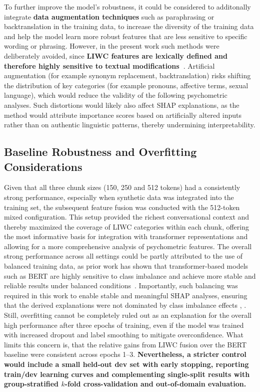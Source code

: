To further improve the model's robustness, it could be considered to additonally integrate \textbf{data augmentation techniques} such as paraphrasing or backtranslation in the training data, to increase the diversity of the training data and help the model learn more robust features that are less sensitive to specific wording or phrasing. However, in the present work such methods were deliberately avoided, since \textbf{LIWC features are lexically defined and therefore highly sensitive to textual modifications~\cite{tausczik2010psychological}}. Artificial augmentation (for example synonym replacement, backtranslation) risks shifting the distribution of key categories (for example pronouns, affective terms, sexual language), which would reduce the validity of the following psychometric analyses. Such distortions would likely also affect SHAP explanations, as the method would attribute importance scores based on artificially altered inputs rather than on authentic linguistic patterns, thereby undermining interpretability. 

\subsection{Baseline Robustness and Overfitting Considerations}
Given that all three chunk sizes (150, 250 and 512 tokens) had a consistently strong performance, especially when synthetic data was integrated into the training set, the subsequent feature fusion was conducted with the 512-token mixed configuration. This setup provided the richest conversational context and thereby maximized the coverage of LIWC categories within each chunk, offering the most informative basis for integration with transformer representations and allowing for a more comprehensive analysis of psychometric features. The overall strong performance across all settings could be partly attributed to the use of balanced training data, as prior work has shown that transformer-based models such as BERT are highly sensitive to class imbalance and achieve more stable and reliable results under balanced conditions~\cite{henningnlpclassimbalance2023}. Importantly, such balancing was required in this work to enable stable and meaningful SHAP analyses, ensuring that the derived explanations were not dominated by class imbalance effects \parencite{liu2022balancedbackgroundexplanationdata}, \parencite{chen2024interpretable}. Still, overfitting cannot be completely ruled out as an explanation for the overall high performance after three epochs of training, even if the model was trained with increased dropout and label smoothing to mitigate overconfidence. What limits this concern is, that the relative gains from LIWC fusion over the BERT baseline were consistent across epochs 1–3. \textbf{Nevertheless, a stricter control would include a small held-out dev set with early stopping, reporting train/dev learning curves and complementing single-split results with group-stratified $k$-fold cross-validation and out-of-domain evaluation.}


